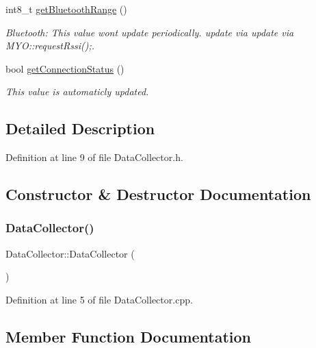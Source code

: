 \begin{DoxyCompactItemize}
int8\+\_\+t \mbox{\hyperlink{class_data_collector_a4992b2e777defed813c7ce15a73bc84b}{get\+Bluetooth\+Range}} ()
\begin{DoxyCompactList}\small\item\em Bluetooth\+: This value wont update periodically. update via update via M\+Y\+O\+::request\+Rssi();. \end{DoxyCompactList}\item 
bool \mbox{\hyperlink{class_data_collector_a2dbac95176fb77c1714573e41ba4490f}{get\+Connection\+Status}} ()
\begin{DoxyCompactList}\small\item\em This value is automaticly updated. \end{DoxyCompactList}\end{DoxyCompactItemize}


\subsection{Detailed Description}


Definition at line 9 of file Data\+Collector.\+h.



\subsection{Constructor \& Destructor Documentation}
\mbox{\label{class_data_collector_a6f7eccfdf026a83317c386a18d16397d}} 
\subsubsection{\texorpdfstring{Data\+Collector()}{DataCollector()}}
{\footnotesize\ttfamily Data\+Collector\+::\+Data\+Collector (\begin{DoxyParamCaption}{ }\end{DoxyParamCaption})}



Definition at line 5 of file Data\+Collector.\+cpp.



\subsection{Member Function Documentation}
\mbox{\label{class_data_collector_a1ef7a2beb37a42d4ac887fef90ac8947}} 
